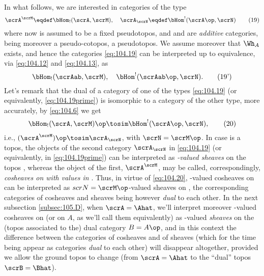 In what follows, we are interested in categories of the type
\begin{equation}
  \label{eq:104.19}
  \scrA^\scrM \eqdef\bHom_!(\scrA,\scrM), \quad\scrA_\scrN
  \eqdef\bHom^!(\scrA\op,\scrN)\tag{19} 
\end{equation}
where now \scrA{} is assumed to be a fixed pseudotopos, and \scrM{}
and \scrN{} are \emph{additive} categories, \scrM{} being
moreover a pseudo-cotopos, \scrN{} a pseudotopos. We assume moreover
that $\Wh_A$ exists, and hence the categories \eqref{eq:104.19} can be
interpreted up to equivalence, via \eqref{eq:104.12} and
\eqref{eq:104.13}, as
\begin{equation}
  \label{eq:104.19prime}
  \bHom_!(\scrAab, \scrM), \quad \bHom^!(\scrAab\op,\scrN).\tag{19'}
\end{equation}
Let's remark that the dual of a category of one of the types
\eqref{eq:104.19} (or equivalently, \eqref{eq:104.19prime}) is
isomorphic to a category of the other type, more accurately, by
\eqref{eq:104.6} we get
\begin{equation}
  \label{eq:104.20}
  \bHom_!(\scrA,\scrM)\op\tosim\bHom^!(\scrA\op,\scrN),\tag{20}
\end{equation}
i.e., $(\scrA^\scrM)\op\tosim\scrA_\scrN$, with $\scrN=\scrM\op$. In
case \scrA{} is a topos, the objects of the second category
$\scrA_\scrN$ in \eqref{eq:104.19} (or equivalently, in
\eqref{eq:104.19prime}) can be interpreted as \emph{\scrN-valued
  sheaves} on the topos \scrA, whereas the object of the first,
$\scrA^\scrM$, may be called, correspondingly, \emph{cosheaves on
  \scrA{} with values in \scrM}. Thus, in virtue of \eqref{eq:104.20},
\scrM-valued cosheaves on \scrA{} can be interpreted as
$scrN=\scrM\op$-valued sheaves on \scrA, the corresponding categories
of cosheaves and sheaves being however \emph{dual} to each other. In
the next subsection \ref{subsec:105.D}, when $\scrA=\Ahat$, we'll
interpret moreover \scrM-valued cosheaves on \scrA{} (or on $A$, as
we'll call them equivalently) as \scrM-valued \emph{sheaves} on the
(topos associated to the) dual category $B=A\op$, and in this context
the difference between the categories of cosheaves and of sheaves
(which for the time being appear as categories \emph{dual} to each
other) will disappear altogether, provided we allow the ground topos
\scrA{} to change (from $\scrA=\Ahat$ to the ``dual'' topos
$\scrB=\Bhat$).

